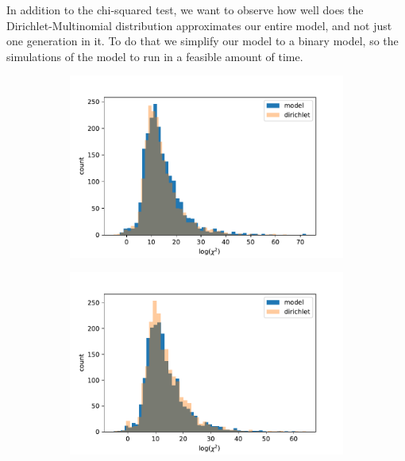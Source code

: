 \documentclass[11pt]{article}
\begin{document}
In addition to the chi-squared test, we want to observe how well does the Dirichlet-Multinomial distribution approximates our entire model, and not just one generation in it.
To do that we simplify our model to a binary model, so the simulations of the model to run in a feasible amount of time.


\begin{figure}[t]
  \begin{center}
  \begin{subfigure}[a]{0.3\textwidth}
    \includegraphics[width=\linewidth]{../figures/chi_square_stats/chi_hist_homogenous_0_01.pdf}
    \end{subfigure}
    \begin{subfigure}[a]{0.3\textwidth}
    \includegraphics[width=\linewidth]{../figures/chi_square_stats/chi_hist_homogenous_0_1.pdf} 

\end{subfigure}
\end{center}
\end{figure}
\end{document}
